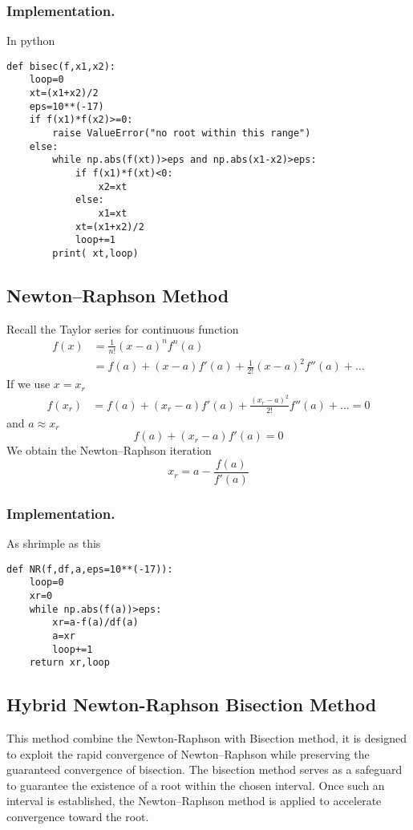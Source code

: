 \documentclass[../../../main.tex]{subfiles}
\begin{document}
\subsubsection{Implementation.}
In python

\begin{verbatim}
def bisec(f,x1,x2):
    loop=0
    xt=(x1+x2)/2
    eps=10**(-17)
    if f(x1)*f(x2)>=0:
        raise ValueError("no root within this range")
    else:
        while np.abs(f(xt))>eps and np.abs(x1-x2)>eps:
            if f(x1)*f(xt)<0:
                x2=xt 
            else:
                x1=xt 
            xt=(x1+x2)/2
            loop+=1
        print( xt,loop)
\end{verbatim}

\subsection{Newton–Raphson Method}
Recall the Taylor series for continuous function
\begin{align*}
    f(x) & =         \frac{1}{n!}(x-a)^n f^{n}(a)              \\
         & =   f(a)+(x-a)f'(a)+\frac{1}{2!}(x-a)^2f''(a)+\dots
\end{align*}
If we use $x=x_r$
\begin{align*}
    f(x_r) & =  f(a)+(x_r-a)f'(a)+\frac{(x_r-a)^2}{2!}f''(a)+\dots=0
\end{align*}
and $a \approx x_r$
\begin{equation*}
    f(a)+(x_r-a)f'(a)=0
\end{equation*}
We obtain the Newton–Raphson iteration
\begin{equation*}
    x_r=a-\frac{f(a )}{f'(a)}
\end{equation*}

\subsubsection{Implementation.}
As shrimple as this
\begin{verbatim}
def NR(f,df,a,eps=10**(-17)):
    loop=0 
    xr=0
    while np.abs(f(a))>eps:
        xr=a-f(a)/df(a)
        a=xr 
        loop+=1
    return xr,loop
\end{verbatim}

\subsection{Hybrid Newton-Raphson Bisection Method}
This method combine the Newton-Raphson with Bisection method, it is designed to exploit the rapid convergence of Newton–Raphson while preserving the guaranteed convergence of bisection.
The bisection method serves as a safeguard to guarantee the existence of a root within the chosen interval.
Once such an interval is established, the Newton–Raphson method is applied to accelerate convergence toward the root.
\end{document}
